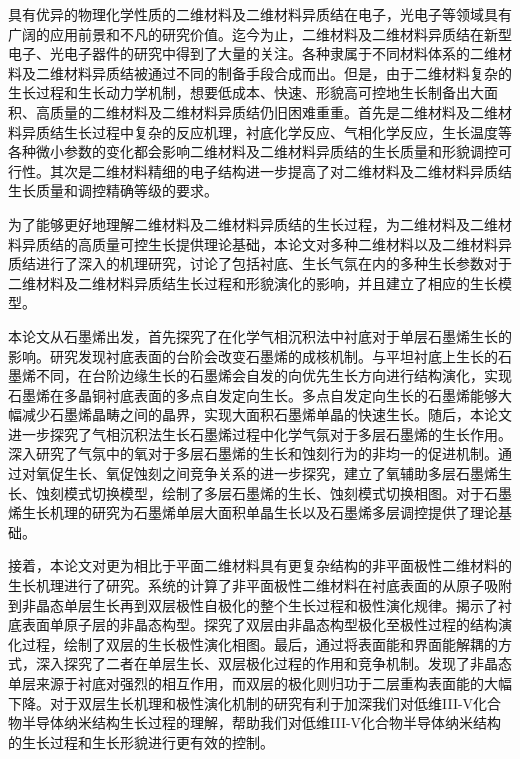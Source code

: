 \begin{chineseabstract}
    具有优异的物理化学性质的二维材料及二维材料异质结在电子，光电子等领域具有广阔的应用前景和不凡的研究价值。迄今为止，二维材料及二维材料异质结在新型电子、光电子器件的研究中得到了大量的关注。各种隶属于不同材料体系的二维材料及二维材料异质结被通过不同的制备手段合成而出。但是，由于二维材料复杂的生长过程和生长动力学机制，想要低成本、快速、形貌高可控地生长制备出大面积、高质量的二维材料及二维材料异质结仍旧困难重重。首先是二维材料及二维材料异质结生长过程中复杂的反应机理，衬底化学反应、气相化学反应，生长温度等各种微小参数的变化都会影响二维材料及二维材料异质结的生长质量和形貌调控可行性。其次是二维材料精细的电子结构进一步提高了对二维材料及二维材料异质结生长质量和调控精确等级的要求。
    
    为了能够更好地理解二维材料及二维材料异质结的生长过程，为二维材料及二维材料异质结的高质量可控生长提供理论基础，本论文对多种二维材料以及二维材料异质结进行了深入的机理研究，讨论了包括衬底、生长气氛在内的多种生长参数对于二维材料及二维材料异质结生长过程和形貌演化的影响，并且建立了相应的生长模型。

    本论文从石墨烯出发，首先探究了在化学气相沉积法中衬底对于单层石墨烯生长的影响。研究发现衬底表面的台阶会改变石墨烯的成核机制。与平坦衬底上生长的石墨烯不同，在台阶边缘生长的石墨烯会自发的向优先生长方向进行结构演化，实现石墨烯在多晶铜衬底表面的多点自发定向生长。多点自发定向生长的石墨烯能够大幅减少石墨烯晶畴之间的晶界，实现大面积石墨烯单晶的快速生长。随后，本论文进一步探究了气相沉积法生长石墨烯过程中化学气氛对于多层石墨烯的生长作用。深入研究了气氛中的氧对于多层石墨烯的生长和蚀刻行为的非均一的促进机制。通过对氧促生长、氧促蚀刻之间竞争关系的进一步探究，建立了氧辅助多层石墨烯生长、蚀刻模式切换模型，绘制了多层石墨烯的生长、蚀刻模式切换相图。对于石墨烯生长机理的研究为石墨烯单层大面积单晶生长以及石墨烯多层调控提供了理论基础。

    接着，本论文对更为相比于平面二维材料具有更复杂结构的非平面极性二维材料的生长机理进行了研究。系统的计算了非平面极性二维材料在衬底表面的从原子吸附到非晶态单层生长再到双层极性自极化的整个生长过程和极性演化规律。揭示了衬底表面单原子层的非晶态构型。探究了双层由非晶态构型极化至极性过程的结构演化过程，绘制了双层的生长极性演化相图。最后，通过将表面能和界面能解耦的方式，深入探究了二者在单层生长、双层极化过程的作用和竞争机制。发现了非晶态单层来源于衬底对强烈的相互作用，而双层的极化则归功于二层重构表面能的大幅下降。对于双层生长机理和极性演化机制的研究有利于加深我们对低维III-V化合物半导体纳米结构生长过程的理解，帮助我们对低维III-V化合物半导体纳米结构的生长过程和生长形貌进行更有效的控制。


\end{chineseabstract}
